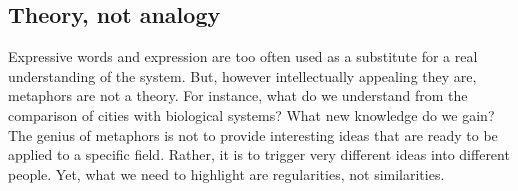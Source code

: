 



\subsection{Theory, not analogy}
\label{sub:theory_not_analogy}

Expressive words and expression are too often used as a substitute for a real
understanding of the system. But, however intellectually appealing they are,
metaphors are not a theory. For instance, what do we understand from the
comparison of cities with biological systems? What new knowledge do we gain? The
genius of metaphors is not to provide interesting ideas that are ready to be
applied to a specific field. Rather, it is to trigger very different ideas into
different people. Yet, what we need to highlight are regularities, not
similarities.\\


